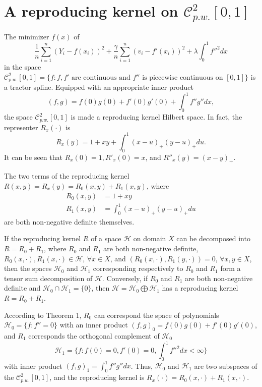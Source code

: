 \section{A reproducing kernel on $\mathcal{C}_{p.w.}^{2}[0,1]$}
The minimizer $f(x)$ of
\begin{equation}\label{maineq}
\frac{1}{n}\sum_{i=1}^{n}(Y_i-f(x_i))^2+\frac{\gamma}{n}\sum_{i=1}^{n}(v_i-f'(x_i))^2+\lambda \int_{0}^{1}f''^2dx
\end{equation}
in the space $\mathcal{C}_{p.w.}^{2}[0,1]=\{f:f,f' \mbox{ are continuous and } f'' \mbox{ is piecewise continuous on } [0,1] \}$ is a tractor spline. Equipped with an appropriate inner product
\begin{equation}
(f,g)=f(0) g(0)+f'(0) g'(0)+\int_{0}^{1}f''g''dx,
\end{equation}
the space $\mathcal{C}_{p.w.}^{2}[0,1]$ is made a reproducing kernel Hilbert space. In fact, the representer $R_x(\cdot)$ is 
\begin{equation}\label{kerneleq}
R_x(y)=1+xy+\int_{0}^{1} (x-u)_+(y-u)_+du.
\end{equation}
It can be seen that $R_x(0)=1, R'_x(0)=x$, and $R''_x(y)=(x-y)_+$.

The two terms of the reproducing kernel $R(x,y)=R_x(y)=R_0(x,y)+R_1(x,y)$, where
\begin{align}
R_0(x,y)&=1+xy \\
R_1(x,y)&=\int_{0}^{1} (x-u)_+(y-u)_+du
\end{align}
are both non-negative definite themselves.

\begin{theorem}
	If the reproducing kernel $R$ of a space $\mathcal{H}$ on domain $X$ can be decomposed into $R = R_0+R_1$, where $R_0$ and $R_1$ are both non-negative definite, $R_0(x,\cdot), R_1(x,\cdot) \in \mathcal{H}$, $\forall x \in X$, and $(R_0(x, ·),R_1(y, ·)) = 0$, $\forall x, y \in X$, then the spaces $\mathcal{H}_0$ and $\mathcal{H}_1$ corresponding respectively to $R_0$ and $R_1$ form a tensor sum decomposition of $\mathcal{H}$. Conversely, if $R_0$ and $R_1$ are both non-negative definite and $\mathcal{H}_0 \cap \mathcal{H}_1 = \{ 0 \}$, then $\mathcal{H} = \mathcal{H}_0 \bigoplus \mathcal{H}_1$ has a reproducing kernel $R = R_0 + R_1$.
\end{theorem}

According to Theorem 1, $R_0$ can correspond the space of polynomials $\mathcal{H}_0=\{f:f''=0\}$ with an inner product $(f,g)_0= f(0)g(0)+f'(0)g'(0)$, and $R_1$ corresponds the orthogonal complement of $\mathcal{H}_0$
\begin{equation*}
\mathcal{H}_1=\{f:f(0)=0, f'(0)=0, \int_{0}^{1}f''^2dx<\infty\}
\end{equation*}
with inner product $(f,g)_1=\int_{0}^{1}f''g''dx$. Thus, $\mathcal{H}_0$ and $\mathcal{H}_1$ are two subspaces of the $\mathcal{C}_{p.w.}^{2}[0,1]$, and the reproducing kernel is $R_x(\cdot) = R_0(x,\cdot)+R_1(x,\cdot)$.

